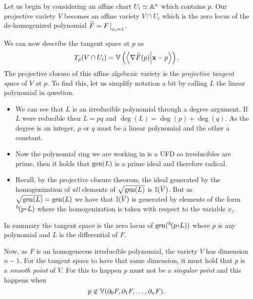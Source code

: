 \documentclass[12pt]{memoir}
\begin{document}
\begin{ptcbr}
Let us begin by considering an affine chart $U_i\simeq\mathbb{A}^n$ which contains $p$. Our projective variety $V$ becomes an affine variety $V\cap U_i$ which is the zero locus of the de-homogenized polynomial $\widetilde{F}=F\eval_{x_i=1}$.\par 
We can now describe the tangent space at $p$ as 
$$T_p(V\cap U_i)=\mathbb{V}\left(\braket{\nabla\widetilde{F}(p)}{\mathbf{x}-p}\right).$$
The projective closure of this affine algebraic variety is the \emph{projective tangent space} of $V$ at $p$. To find this, let us simplify notation a bit by calling $L$ the linear polynomial in question.
\begin{itemize}
	\item We can see that $L$ is an irreducible polynomial through a degree argument. If $L$ were reducible then $L=pq$ and $\deg(L)=\deg(p)+\deg(q)$. As the degree is an integer, $p$ or $q$ must be a linear polynomial and the other a constant. 
	\item Now the polynomial ring we are working in is a UFD so irreducibles are prime, then it holds that $\operatorname{gen}(L)$ is a prime ideal and therefore radical. 
	\item Recall, by the projective closure theorem, the ideal generated by the homogenization of \emph{all} elements of $\sqrt{\operatorname{gen}(L)}$ is $\mathbb{I}(\overline{V})$. But as $\sqrt{\operatorname{gen}(L)}=\operatorname{gen}(L)$ we have that $\mathbb{I}(\overline{V})$ is generated by elements of the form $\pre{h}(p\.L)$ where the homogenization is taken with respect to the variable $x_i$.
\end{itemize}
In summary the tangent space is the zero locus of $\gen(\pre{h}(p\.L))$ where $p$ is any polynomial and $L$ is the differential of $F$.\par 
Now, as $F$ is an homogeneous irreducible polynomial, the variety $V$ has dimension $n-1$. For the tangent space to have that same dimension, it must hold that $p$ is a \emph{smooth point} of $V$. For this to happen $p$ must not be a \emph{singular point} and this happens when 
$$p\not\in\mathbb{V}(\partial_0F,\partial_1F,\dots,\partial_nF).$$
\end{ptcbr}
\end{document}

